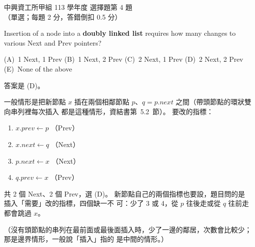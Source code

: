 \begin{pastexam}[label={px:nchu-113-dsa-04}]{中興資工所甲組 113 學年度 選擇題第 4 題}
（單選；每題 2 分，答錯倒扣 0.5 分）

Insertion of a node into a \textbf{doubly linked list} requires how many changes to various Next and Prev
pointers?

(A)~1 Next, 1 Prev \qquad (B)~1 Next, 2 Prev \qquad (C)~2 Next, 1 Prev \qquad (D)~2 Next, 2 Prev\\
(E)~None of the above
\end{pastexam}

\begin{pastsoln}
答案是 (D)。

一般情形是把新節點 $x$ 插在兩個相鄰節點 $p$、$q = p.\mathit{next}$ 之間（帶頭節點的環狀雙向串列裡每次插入
都是這種情形，資結書第~5.2~節）。 要改的指標：
\begin{enumerate}
\item $x.\mathit{prev} \gets p$ \hfill（Prev）
\item $x.\mathit{next} \gets q$ \hfill（Next）
\item $p.\mathit{next} \gets x$ \hfill（Next）
\item $q.\mathit{prev} \gets x$ \hfill（Prev）
\end{enumerate}
共 2 個 Next、2 個 Prev，選 (D)。 新節點自己的兩個指標也要設，題目問的是插入「需要」改的指標，四個缺一不
可：少了 3 或 4，從 $p$ 往後走或從 $q$ 往前走都會跳過 $x$。

（沒有頭節點的串列在最前面或最後面插入時，少了一邊的鄰居，次數會比較少；那是邊界情形，一般說「插入」指的
是中間的情形。）
\end{pastsoln}
